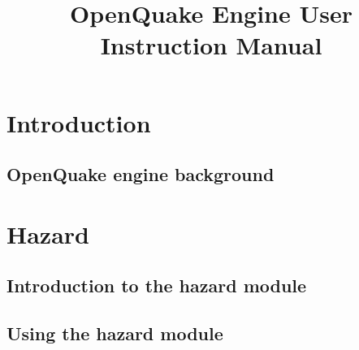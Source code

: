\documentclass[12pt,a4paper,headings=small,version=last,dvips]{scrbook}
\begin{document}
\restoregeometry
\cleardoublepage
%
\setcounter{page}{1}
\begin{titlepage}
	\titlehead{\emph{``OpenQuake: Calculate, share, explore''}}
	\title{ \textcolor{blue01}{\textsf{\bfseries\Huge OpenQuake Engine User Instruction Manual}}  }
	\date{}
\end{titlepage}
\pagestyle{scrheadings}
\maketitle
%
%
\cleardoublepage
%
\tableofcontents
\part{Introduction}
\chapter{OpenQuake engine background}
	
%	
\thispagestyle{empty}
\part{Hazard}
\chapter{Introduction to the hazard module}
    \label{chap:oqhazintro}
	
    
    
\chapter{Using the hazard module}
	\label{chap:hazinp}
	
\end{document}
